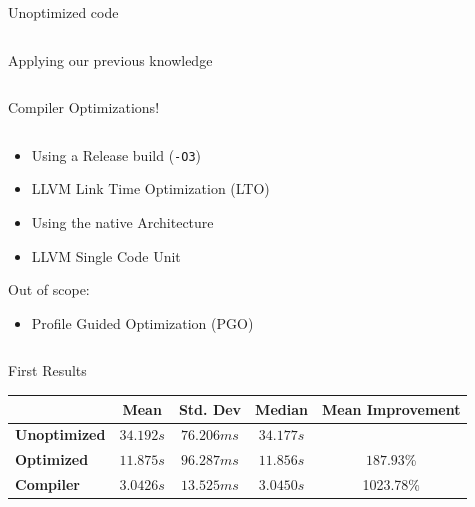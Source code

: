 \documentclass[compress,aspectratio=169]{beamer}
\begin{document}
\begin{frame}[fragile]{Unoptimized code}
  \begin{tcolorbox}[title=Unoptimized Version]
    \footnotesize\inputminted[xleftmargin=1em,linenos]{rust}{../assets/01nxn.rs}
  \end{tcolorbox}
\end{frame}

\begin{frame}[fragile]{Applying our previous knowledge}
  \begin{tcolorbox}[title=First optimized Version]
    \footnotesize\inputminted[xleftmargin=1em,linenos]{rust}{../assets/02nxn.rs}
  \end{tcolorbox}
\end{frame}

\begin{frame}{Compiler Optimizations!}
  \begin{columns}
    \begin{column}{0.5\textwidth}
  \begin{itemize}
    \item Using a Release build (\texttt{-O3})
    \item LLVM Link Time Optimization (LTO)
    \item Using the native Architecture
    \item LLVM Single Code Unit
  \end{itemize}
  Out of scope:
  \begin{itemize}
    \item Profile Guided Optimization (PGO)
  \end{itemize}
    \end{column}
    \begin{column}{0.5\textwidth}
    \footnotesize\inputminted[xleftmargin=1em,linenos]{toml}{../assets/cargo.toml}
    \end{column}
  \end{columns}
\end{frame}

\begin{frame}{First Results}
  \begin{table}[h]
\centering
\begin{tabular}{|l|c|c|c|c|}
\hline
  & \textbf{Mean} & \textbf{Std. Dev} & \textbf{Median} & \textbf{Mean Improvement}\\
\hline
  \textbf{Unoptimized} & $34.192s$ & $76.206ms$ & $34.177s$ & \\
  \hline
  \textbf{Optimized} & $11.875s$ & $96.287ms$ & $11.856s$ & $187.93$\%\\
  \hline
  \textbf{Compiler} &  $3.0426s$ & $13.525ms$ &  $3.0450s$ & 1023.78\%\\
\hline
\end{tabular}
\end{table}
\end{frame}
\end{document}
